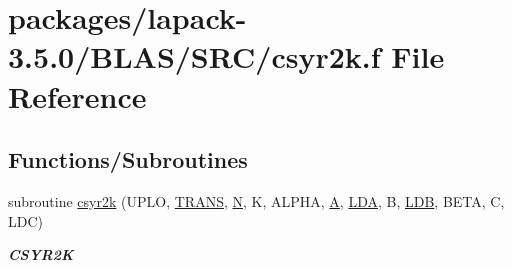 \hypertarget{lapack-3_85_80_2BLAS_2SRC_2csyr2k_8f}{}\section{packages/lapack-\/3.5.0/\+B\+L\+A\+S/\+S\+R\+C/csyr2k.f File Reference}
\label{lapack-3_85_80_2BLAS_2SRC_2csyr2k_8f}
\subsection*{Functions/\+Subroutines}
\begin{DoxyCompactItemize}
\item 
subroutine \hyperlink{group__complex__blas__level3_gaa8320d51ded07cd3038db237fd400547}{csyr2k} (U\+P\+L\+O, \hyperlink{superlu__enum__consts_8h_a0c4e17b2d5cea33f9991ccc6a6678d62a1f61e3015bfe0f0c2c3fda4c5a0cdf58}{T\+R\+A\+N\+S}, \hyperlink{polmisc_8c_a0240ac851181b84ac374872dc5434ee4}{N}, K, A\+L\+P\+H\+A, \hyperlink{classA}{A}, \hyperlink{example__user_8c_ae946da542ce0db94dced19b2ecefd1aa}{L\+D\+A}, B, \hyperlink{example__user_8c_a50e90a7104df172b5a89a06c47fcca04}{L\+D\+B}, B\+E\+T\+A, C, L\+D\+C)
\begin{DoxyCompactList}\small\item\em {\bfseries C\+S\+Y\+R2\+K} \end{DoxyCompactList}\end{DoxyCompactItemize}
